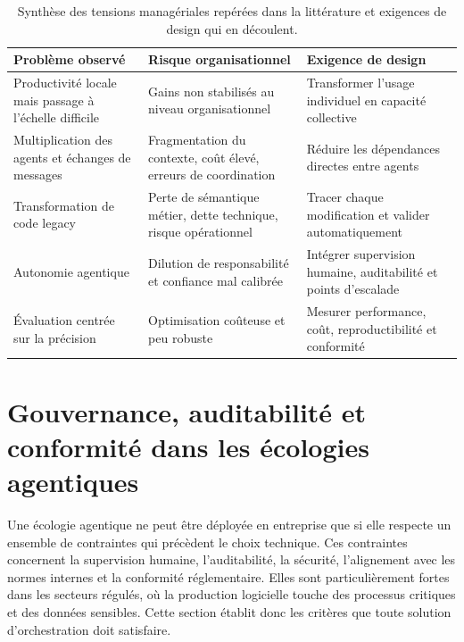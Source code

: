\begin{table}[H]
\centering
\small
\begin{tabularx}{\linewidth}{@{}XXX@{}}
\toprule
\textbf{Problème observé} & \textbf{Risque organisationnel} & \textbf{Exigence de design} \\
\midrule
Productivité locale mais passage à l'échelle difficile & Gains non stabilisés au niveau organisationnel & Transformer l'usage individuel en capacité collective \\
Multiplication des agents et échanges de messages & Fragmentation du contexte, coût élevé, erreurs de coordination & Réduire les dépendances directes entre agents \\
Transformation de code legacy & Perte de sémantique métier, dette technique, risque opérationnel & Tracer chaque modification et valider automatiquement \\
Autonomie agentique & Dilution de responsabilité et confiance mal calibrée & Intégrer supervision humaine, auditabilité et points d'escalade \\
Évaluation centrée sur la précision & Optimisation coûteuse et peu robuste & Mesurer performance, coût, reproductibilité et conformité \\
\bottomrule
\end{tabularx}
\caption{Synthèse des tensions managériales repérées dans la littérature et exigences de design qui en découlent.}
\label{tab:rev-tensions-manageriales}
\end{table}

\section{Gouvernance, auditabilit\'e et conformit\'e dans les \'ecologies agentiques}\label{sec:rev-gouvernance}

Une écologie agentique ne peut être déployée en entreprise que si elle respecte un ensemble de contraintes qui précèdent le choix technique. Ces contraintes concernent la supervision humaine, l'auditabilité, la sécurité, l'alignement avec les normes internes et la conformité réglementaire. Elles sont particulièrement fortes dans les secteurs régulés, où la production logicielle touche des processus critiques et des données sensibles. Cette section établit donc les critères que toute solution d'orchestration doit satisfaire.

